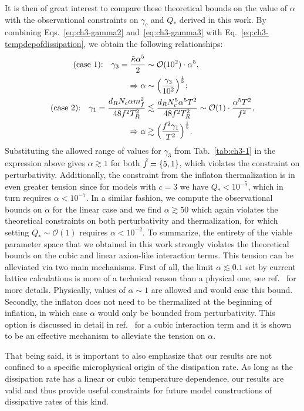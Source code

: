 It is then of great interest to compare these theoretical bounds on the value of $\alpha$ with the observational constraints on $\gamma_c$ and $Q_{*}$ derived in this work. By combining Eqs.~\ref{eq:ch3-gamma2} and~\ref{eq:ch3-gamma3} with Eq.~\ref{eq:ch3-tempdepofdissipation}, we obtain the following relationships:
\begin{align}
    \text{(case 1):} \quad \gamma_3=\frac{\Tilde{\kappa} \alpha^5}{2}&\sim \mathcal{O}(10^2)\cdot \alpha^5, \\
    \Rightarrow \alpha &\sim \Big(\frac{ \gamma_3}{10^2}\Big)^{\frac{1}{5}}; \\
    \text{(case 2):} \quad \gamma_1=\frac{d_R N_c \alpha m_f^2}{48 f^2 T_R^2} &\lesssim \frac{d_R N_c^5 \alpha^5 T^2}{48 f^2 T_R^2} \sim \mathcal{O}(1)\cdot \frac{\alpha^5 T^2}{f^2}, \\
    \Rightarrow \alpha &\gtrsim \Big(\frac{f^2 \gamma_1}{T^2}\Big)^{\frac{1}{5}}. \label{eq:ch3-alpha_2}
\end{align}
Substituting the allowed range of values for $\gamma_3$ from Tab.~\ref{tab:ch3-1} in the expression above gives $\alpha \gtrsim 1$ for both $\Tilde{f}=\{5,1\}$, which violates the constraint on perturbativity. Additionally, the constraint from the inflaton thermalization is in even greater tension since for models with $c=3$ we have $Q_{*}<10^{-5}$, which in turn requires $\alpha<10^{-7}$. In a similar fashion, we compute the observational bounds on $\alpha$ for the linear case and we find $\alpha \gtrsim 50$ which again violates the theoretical constraints on both perturbativity and thermalization, for which setting $Q_{*}\sim \mathcal{O}(1)$ requires $\alpha<10^{-2}$. To summarize, the entirety of the viable parameter space that we obtained in this work strongly violates the theoretical bounds on the cubic and linear axion-like interaction terms. This tension can be alleviated via two main mechanisms. First of all, the limit $\alpha\lesssim 0.1$ set by current lattice calculations is more of a technical reason than a physical one, see ref.~\cite{Moore:2010jd} for more details. Physically, values of $\alpha \sim 1$ are allowed and would ease this bound. Secondly, the inflaton does not need to be thermalized at the beginning of inflation, in which case $\alpha$ would only be bounded from perturbativity. This option is discussed in detail in ref.~\cite{Reyimuaji:2020bkm} for a cubic interaction term and it is shown to be an effective mechanism to alleviate the tension on $\alpha$.

That being said, it is important to also emphasize that our results are not confined to a specific microphysical origin of the dissipation rate. As long as the dissipation rate has a linear or cubic temperature dependence, our results are valid and thus provide useful constraints for future model constructions of dissipative rates of this kind.

